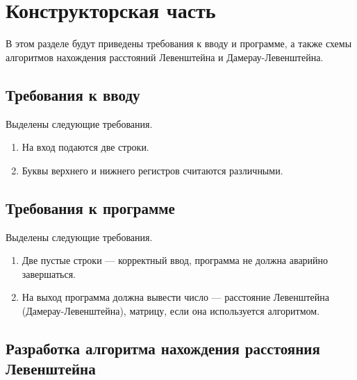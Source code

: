 \chapter{Конструкторская часть}
В этом разделе будут приведены требования к вводу и программе, а также схемы алгоритмов нахождения расстояний Левенштейна и Дамерау-Левенштейна.

\section{Требования к вводу}
Выделены следующие требования.
\begin{enumerate}
	\item На вход подаются две строки.
	\item Буквы верхнего и нижнего регистров считаются различными.
\end{enumerate}

\section{Требования к программе}
Выделены следующие требования.
\begin{enumerate}
	\item Две пустые строки --- корректный ввод, программа не должна аварийно завершаться.
	\item На выход программа должна вывести число --- расстояние Левенштейна (Дамерау-Левенштейна), матрицу, если она используется алгоритмом.
\end{enumerate}

\section{Разработка алгоритма нахождения расстояния Левенштейна}

